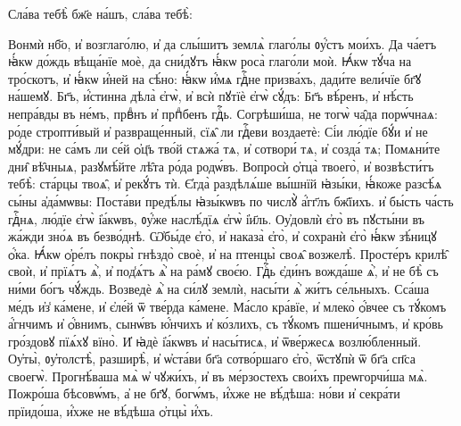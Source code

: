 
\hKv Сла́ва тебѣ̀ бж҃е  на́шъ, сла́ва тебѣ̀: 

%

\hKv Вонмѝ нб҃о, и҆ возглаго́лю, и҆ да слы́шитъ землѧ̀  глаго́лы ᲂу҆́стъ мои́хъ. 
\hKv Да ча́етъ ꙗ҆́кѡ до́ждь  вѣща́нїе моѐ, да сни́дꙋтъ ꙗ҆́кѡ роса̀ глаго́ли моѝ. 
\hKv  Ꙗ҆́кѡ тꙋ́ча на тро́скотъ, и҆ ꙗ҆́кѡ и҆́ней на сѣ́но:  ꙗ҆́кѡ и҆́мѧ гдⷭ҇не призва́хъ, дади́те вели́чїе бг҃ꙋ  на́шемꙋ. 
\hKv Бг҃ъ, и҆́стинна дѣла̀ є҆гѡ̀, и҆ всѝ пꙋтїѐ  є҆гѡ̀ сꙋ́дъ: 
\hKv Бг҃ъ вѣ́ренъ, и҆ нѣ́сть непра́вды въ  не́мъ, првⷣнъ и҆ прпⷣбенъ гдⷭ҇ь. 
\hKv Согрѣши́ша, не  тогѡ̀ ча̑да порѡ́чнаѧ: ро́де стропти́вый и҆ развраще́нный,  сїѧ̑ ли гдⷭ҇еви воздаетѐ: 
\hKv Сі́и лю́дїе бꙋ́и и҆ не  мꙋ́дри: не са́мъ ли се́й ѻ҆ц҃ъ тво́й стѧжа́ тѧ, и҆ сотвори́  тѧ, и҆ созда́ тѧ; 
\hKv Помѧни́те дни̑ вѣ̑чныѧ, разꙋмѣ́йте  лѣ̑та ро́да родѡ́въ. 
\hKv Вопросѝ ѻ҆тца̀ твоего̀, и҆  возвѣсти́тъ тебѣ̀: ста́рцы твоѧ̑, и҆ рекꙋ́тъ тѝ. 
\hKv  Є҆гда̀ раздѣлѧ́ше вы́шнїй ꙗ҆зы́ки, ꙗ҆́коже разсѣ́ѧ  сы́ны а҆да́мѡвы: 
\hKv Поста́ви предѣ́лы ꙗ҆зы́кѡвъ по  числꙋ̀ а҆́гг҃лъ бж҃їихъ. и҆ бы́сть  ча́сть гдⷭ҇нѧ, лю́дїе є҆гѡ̀ і҆а́кѡвъ, ᲂу҆́же  наслѣ́дїѧ є҆гѡ̀ і҆и҃ль. 
\hKv Оу҆довлѝ є҆го̀ въ  пꙋсты́ни въ жа́жди зно́ѧ въ безво́днѣ. 
\hKv Ѡ҆бы́де є҆го̀, и҆  наказа̀ є҆го̀, и҆ сохранѝ є҆го̀ ꙗ҆́кѡ зѣ́ницꙋ ѻ҆́ка.  
\hKv Ꙗ҆́кѡ ѻ҆ре́лъ покры̀ гнѣздо̀ своѐ, и҆ на птенцы̀  своѧ̑ возжелѣ̀. Просте́ръ крилѣ̑ своѝ, и҆ прїѧ́тъ ѧ҆̀, и҆  под̾ѧ́тъ ѧ҆̀ на ра́мꙋ своє́ю. 
\hKv Гдⷭ҇ь є҆ди́нъ  вожда́ше ѧ҆̀, и҆ не бѣ̀ съ ни́ми бо́гъ чꙋ́ждь. 
\hKv  Возведѐ ѧ҆̀ на си́лꙋ землѝ, насы́ти ѧ҆̀ жи́тъ се́льныхъ.  
\hKv Сса́ша ме́дъ и҆з̾ ка́мене, и҆ є҆ле́й ѿ тве́рда  ка́мене. 
\hKv Ма́сло кра́вїе, и҆ млеко̀ ѻ҆́вчее съ  тꙋ́комъ а҆́гнчимъ и҆ ѻ҆́внимъ, сынѡ́въ ю҆́нчихъ и҆  ко́злихъ, съ тꙋ́комъ пшени́чнымъ, и҆ кро́вь гро́здовꙋ пїѧ́хꙋ  вїно̀. 
\hKv И҆ ꙗ҆дѐ і҆а́кѡвъ и҆ насы́тисѧ, и҆ ѿве́ржесѧ  возлю́бленный. 
\hKv Оу҆ты̀, ᲂу҆толстѣ̀, разширѣ̀, и҆  ѡ҆ста́ви бг҃а сотво́ршаго є҆го̀, ѿстꙋпѝ ѿ бг҃а сп҃са  своегѡ̀. 
\hKv Прогнѣ́ваша мѧ̀ ѡ҆ чꙋжи́хъ, и҆ въ  ме́рзостехъ свои́хъ преѡгорчи́ша мѧ̀. 
\hKv Пожро́ша  бѣсовѡ́мъ, а҆ не бг҃ꙋ,   богѡ́мъ, и҆́хже не вѣ́дѣша: но́ви и҆ секра́ти прїидо́ша,  и҆́хже не вѣ́дѣша ѻ҆тцы̀ и҆́хъ. 
